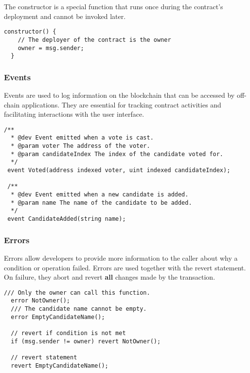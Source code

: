 \documentclass[12pt]{article}
\begin{document}
The constructor is a special function that runs once during the contract's deployment and cannot be invoked later.

\noindent
\begin{minipage}[c]{\textwidth}
\begin{lstlisting}[language=Solidity]
  constructor() {
    // The deployer of the contract is the owner
    owner = msg.sender;
  }
\end{lstlisting}
\end{minipage}

\subsubsection*{Events}

Events are used to log information on the blockchain that can be accessed by off-chain applications. They are essential for tracking contract activities and facilitating interactions with the user interface.

\noindent
\begin{minipage}[c]{\textwidth}
\begin{lstlisting}[language=Solidity]
  /**
  * @dev Event emitted when a vote is cast.
  * @param voter The address of the voter.
  * @param candidateIndex The index of the candidate voted for.
  */
 event Voted(address indexed voter, uint indexed candidateIndex);

 /**
  * @dev Event emitted when a new candidate is added.
  * @param name The name of the candidate to be added.
  */
 event CandidateAdded(string name);
\end{lstlisting}
\end{minipage}

\subsubsection*{Errors}

Errors allow developers to provide more information to the caller about why a condition or operation failed. Errors are used together with the revert statement. On failure, they abort and revert \textbf{all} changes made by the transaction.

\noindent
\begin{minipage}[c]{\textwidth}
\begin{lstlisting}[language=Solidity]
  /// Only the owner can call this function.
  error NotOwner();
  /// The candidate name cannot be empty.
  error EmptyCandidateName();

  // revert if condition is not met
  if (msg.sender != owner) revert NotOwner();

  // revert statement
  revert EmptyCandidateName();
\end{lstlisting}
\end{minipage}
\end{document}
